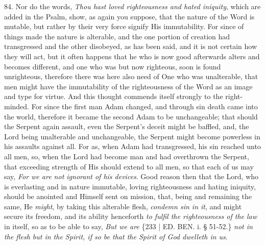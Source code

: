 84. Nor do the words, \emph{Thou
hast loved righteousness and hated iniquity}, which are added in
the Psalm, show, as again you suppose, that the nature of the Word is
mutable, but rather by their very force signify His immutability. For
since of things made the nature is alterable, and the one portion of
creation had transgressed and the other disobeyed, as has been said,
and it is not certain how they will act, but it often happens that he
who is now good afterwards alters and becomes different, and one who
was but now righteous, soon is found unrighteous, therefore there was
here also need of One who was unalterable, that men might have the
immutability of the righteousness of the Word as an image and type for
virtue. And this thought commends itself strongly to the right-minded.
For since the first man Adam changed, and through sin death came into
the world, therefore it became the second Adam to be unchangeable;
that should the Serpent again assault, even the Serpent's deceit might
be baffled, and, the Lord being unalterable and unchangeable, the
Serpent might become powerless in his assaults against all. For as,
when Adam had transgressed, his sin reached unto all men, so, when the
Lord had become man and had overthrown the Serpent, that exceeding
strength of His should extend to all men, so that each of us may say, \emph{For
we are not ignorant of his devices}. Good reason then that the
Lord, who is everlasting and in nature immutable, loving righteousness
and hating iniquity, should be anointed and Himself sent on mission,
that, being and remaining the same, He \emph{might}, by taking this
alterable flesh, \emph{condemn sin in it}, and might secure its
freedom, and its ability henceforth \emph{to fulfil the righteousness of
the law} in itself, so as to be able to say, \emph{But we are} \{233
| ED. BEN. i. § 51-52.\} \emph{not
in the flesh but in the Spirit, if so be that the Spirit of God
dwelleth in us}.

